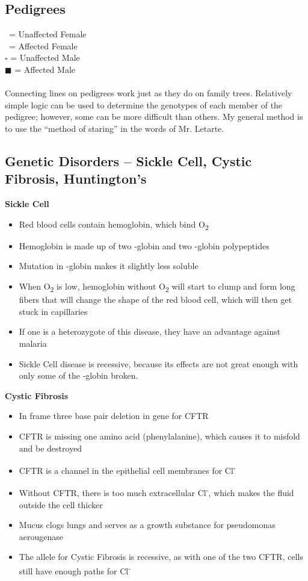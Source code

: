 \documentclass{article}
\begin{document}
\subsection{Pedigrees}
\Circle \ = Unaffected Female\\
\CIRCLE \ = Affected Female\\
$\square$ = Unaffected Male\\
$\blacksquare$ = Affected Male\\
\\
Connecting lines on pedigrees work just as they do on family trees.
Relatively simple logic can be used to determine the genotypes of each member of the pedigree; however, some can be more difficult than others.
My general method is to use the ``method of staring'' in the words of Mr. Letarte.

\subsection{Genetic Disorders -- Sickle Cell, Cystic Fibrosis, Huntington's}
\textbf{Sickle Cell}
\begin{itemize}
\item Red blood cells contain hemoglobin, which bind O\textsubscript{2}
\item Hemoglobin is made up of two
\textalpha -globin and two \textbeta -globin polypeptides
\item Mutation in \textbeta -globin makes it slightly less soluble
\item When O\textsubscript{2} is low, hemoglobin without O\textsubscript{2} will start to
clump and form long fibers that will change the shape of the red blood cell, which will then get stuck in capillaries
\item If one is a heterozygote of this disease, they have an advantage against malaria
\item Sickle Cell disease is recessive, because its effects are not great enough with only some of the \textbeta -globin broken.
\end{itemize}

\textbf{Cystic Fibrosis}
\begin{itemize}
\item In frame three base pair deletion in gene for CFTR
\item CFTR is missing one amino acid (phenylalanine), which causes it to misfold and be
destroyed
\item CFTR is a channel in the epithelial cell membranes for Cl\textsuperscript{-}
\item Without CFTR, there is too much extracellular Cl\textsuperscript{-}, which makes the fluid outside the cell thicker
\item Mucus clogs lungs and serves as a growth substance for pseudomonas aerougenase
\item The allele for Cystic Fibrosis is recessive, as with one of the two CFTR, cells still have enough paths for Cl\textsuperscript{-}
\end{itemize}
\end{document}
